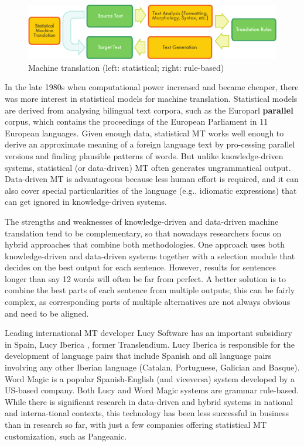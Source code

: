 \begin{multicols}{2}
\begin{figure}[htb]
  \center
  \includegraphics[width=\textwidth]{../_media/english/machine_translation}
  \caption{Machine translation (left: statistical; right: rule-based)}
  \label{fig:mtarch_en}
\end{figure}
 
In the late 1980s when computational power increased and became cheaper, there was more interest in statistical models for machine translation. Statistical models are derived from analysing bilingual text corpora, such as the Europarl \textbf{parallel} corpus, which contains the proceedings of the European Parliament in 11 European languages. Given enough data, statistical MT works well enough to derive an approximate meaning of a foreign language text by pro-cessing parallel versions and finding plausible patterns of words. But unlike knowledge-driven systems, statistical (or data-driven) MT often generates ungrammatical output. Data-driven MT is advantageous because less human effort is required, and it can also cover special particularities of the language (e.g., idiomatic expressions) that can get ignored in knowledge-driven systems.

The strengths and weaknesses of knowledge-driven and data-driven machine translation tend to be complementary, so that nowadays researchers focus on hybrid approaches that combine both methodologies. One approach uses both knowledge-driven and data-driven systems together with a selection module that decides on the best output for each sentence. However, results for sentences longer than say 12 words will often be far from perfect. A better solution is to combine the best parts of each sentence from multiple outputs; this can be fairly complex, as corresponding parts of multiple alternatives are not always obvious and need to be aligned. 

Leading international MT developer Lucy Software has an important subsidiary in Spain, Lucy Iberica , former Translendium. Lucy Iberica is responsible for the development of language pairs that include Spanish and all language pairs involving any other Iberian language (Catalan, Portuguese, Galician and Basque). Word Magic is a popular Spanish-English (and viceversa) system developed by a US-based company. Both Lucy and Word Magic systems are grammar rule-based. While there is significant research in data-driven and hybrid systems in national and interna-tional contexts, this technology has been less successful in business than in research so far, with just a few companies offering statistical MT customization, such as Pangeanic. 


\end{multicols}
